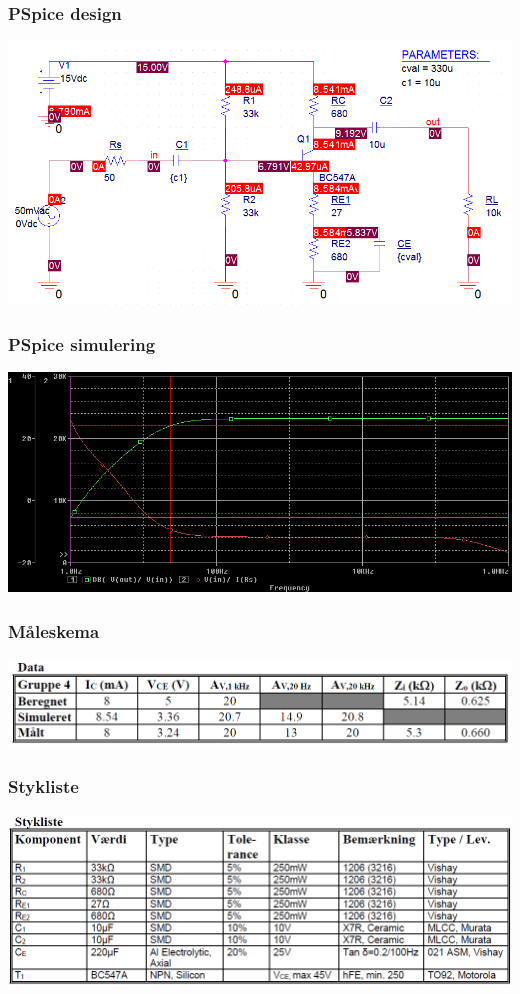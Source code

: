 \documentclass{beamer}
\begin{document}
\begin{frame}
	\frametitle{PSpice design}
	\begin{center}
		\includegraphics[width=1\textwidth]{images/pspice.png}
	\end{center}	
\end{frame}

\begin{frame}
	\frametitle{PSpice simulering}
	\begin{center}
		\includegraphics[width=1\textwidth]{images/pspice_plot.png}
	\end{center}
\end{frame}

\begin{frame}
	\frametitle{Måleskema}
	\begin{center}
		\includegraphics[width=1\textwidth]{images/data.png}
	\end{center}	
\end{frame}

\begin{frame}
	\frametitle{Stykliste}
	\begin{center}
		\includegraphics[width=1\textwidth]{images/stykliste.png}
	\end{center}	
\end{frame}
\end{document}
